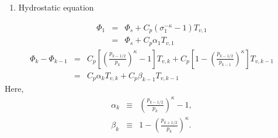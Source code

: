 \begin{enumerate}
\def\labelenumi{\arabic{enumi}.}
\setcounter{enumi}{1}
\tightlist
\item
  Hydrostatic equation
\end{enumerate}
\begin{eqnarray}
 \Phi_{1}  &=&  \Phi_{s} + C_{p} ( \sigma_{1}^{-\kappa} - 1  ) T_{v,1} \\
           &=&  \Phi_{s} + C_{p} \alpha_{1} T_{v,1}
\end{eqnarray}
\begin{eqnarray}
 \Phi_k - \Phi_{k-1}
  &=&  C_{p}
   \left[ \left( \frac{ p_{k-1/2} }{ p_k } \right)^{\kappa}
          - 1 \right] T_{v,k}
       + C_{p}
   \left[ 1-
         \left( \frac{ p_{k-1/2} }{ p_{k-1} } \right)^{\kappa}
              \right] T_{v,k-1} \\
   &=&    C_{p} \alpha_k T_{v,k} + C_{p} \beta_{k-1} T_{v,k-1}
\end{eqnarray}
Here,
\begin{eqnarray}
 \alpha_k &\equiv & \left( \frac{ p_{k-1/2} }
                               { p_k } \right)^{\kappa} -1, \\
 \beta_k &\equiv &  1- \left( \frac{ p_{k+1/2} }
                               { p_k } \right)^{\kappa} .
\end{eqnarray}

